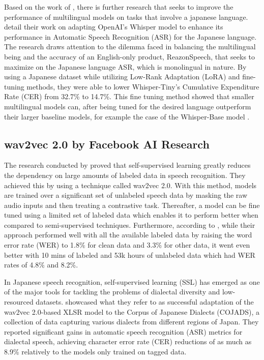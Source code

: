 Based on the work of \textcite{radford2023robust}, there is further research that seeks to improve the performance of multilingual models on tasks that involve a japanese language. \textcite{bajo2024efficient} detail their work on adapting OpenAI’s Whisper model to enhance its performance in Automatic Speech Recognition (ASR) for the Japanese language. The research draws attention to the dilemma faced in balancing the multilingual being and the accuracy of an English-only product, ReazonSpeech, that seeks to maximize on the Japanese language ASR, which is monolingual in nature. By using a Japanese dataset while utilizing Low-Rank Adaptation (LoRA) and fine-tuning methods, they were able to lower Whisper-Tiny’s Cumulative Expenditure Rate (CER) from 32.7\% to 14.7\%. This fine tuning method showed that smaller multilingual models can, after being tuned for the desired language outperform their larger baseline models, for example the case of the Whisper-Base model \parencite{bajo2024efficient}.

\subsection{wav2vec 2.0 by Facebook AI Research}
The research conducted by \textcite{baevski2020wav2vec} proved that self-supervised learning greatly reduces the dependency on large amounts of labeled data in speech recognition. They achieved this by using a technique called wav2vec 2.0. With this method, models are trained over a significant set of unlabeled speech data by masking the raw audio inputs and then treating a contrastive task. Thereafter, a model can be fine tuned using a limited set of labeled data which enables it to perform better when compared to semi-supervised techniques. Furthermore, according to \textcite{baevski2020wav2vec}, while their approach performed well with all the available labeled data by raising the word error rate (WER) to 1.8\% for clean data and 3.3\% for other data, it went even better with 10 mins of labeled and 53k hours of unlabeled data which had WER rates of 4.8\% and 8.2\%.


In Japanese speech recognition, self-supervised learning (SSL) has emerged as one of the major tools for tackling the problems of dialectal diversity and low-resourced datasets. \textcite{miwa2023dialect} showcased what they refer to as successful adaptation of the wav2vec 2.0-based XLSR model to the Corpus of Japanese Dialects (COJADS), a collection of data capturing various dialects from different regions of Japan. They reported significant gains in automatic speech recognition (ASR) metrics for dialectal speech, achieving character error rate (CER) reductions of as much as 8.9\% relatively to the models only trained on tagged data. 


